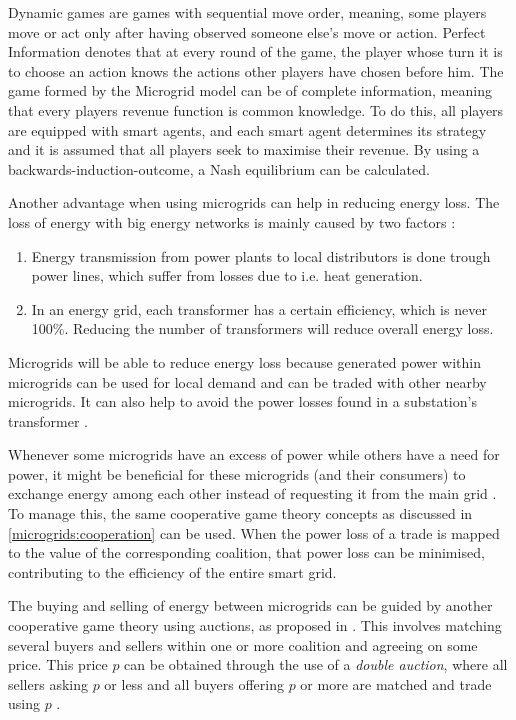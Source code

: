 Dynamic games are games with sequential move order, meaning, some players move or act only after having observed someone else’s move or action. Perfect Information denotes that at every round of the game, the player whose turn it is to choose an action knows the actions other players have chosen before him. The game formed by the Microgrid model can be of complete information, meaning that every players revenue function is common knowledge.
To do this, all players are equipped with smart agents, and each smart agent determines its strategy and it is assumed that all players seek to maximise their revenue. By using a backwards-induction-outcome, a Nash equilibrium can be calculated.\cite{MicrogridModellingPetrosAristidou}


Another advantage when using microgrids can help in reducing energy loss. The loss of energy with big energy networks is mainly caused by two factors \cite{EnergyLossURL}: 

\begin{enumerate}
\item Energy transmission from power plants to local distributors is done trough power lines, which suffer from losses due to i.e. heat generation\cite{LasseterPaigi2004}.
\item In an energy grid, each transformer has a certain efficiency, which is never 100\%. Reducing the number of transformers will reduce overall energy loss.
\end{enumerate}

Microgrids will be able to reduce energy loss because generated power within microgrids can be used for local demand and can be traded with other nearby microgrids. It can also help to avoid the power losses found in a substation's transformer \cite{keypaper}.

Whenever some microgrids have an excess of power while others have a need for power, it might be beneficial for these microgrids (and their consumers) to exchange energy among each other instead of requesting it from the main grid \cite{SaadHanPoorEtAl2011}. To manage this, the same cooperative game theory concepts as discussed in \ref{microgrids:cooperation} can be used. When the power loss of a trade is mapped to the value of the corresponding coalition, that power loss can be minimised, contributing to the efficiency of the entire smart grid. 

The buying and selling of energy between microgrids can be guided by another cooperative game theory using auctions, as proposed in \cite{SaadHanPoorEtAl2011}. This involves matching several buyers and sellers within one or more coalition and agreeing on some price. This price $p$ can be obtained through the use of a \emph{double auction}, where all sellers asking $p$ or less and all buyers offering $p$ or more are matched and trade using $p$ \cite{gjerstad1998price}.

